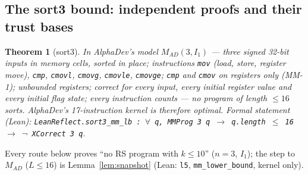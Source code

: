 \documentclass[11pt]{article}
\newtheorem{theorem}{Theorem}\newtheorem{lemma}[theorem]{Lemma}\newtheorem{corollary}[theorem]{Corollary}
\theoremstyle{remark}\newtheorem{remark}[theorem]{Remark}
\begin{document}
\subsection{The sort3 bound: independent proofs and their trust bases}\label{sec:sort3trust}
\begin{theorem}[sort3]\label{thm:sort3}
In AlphaDev's model $M_{AD}(3, I_1)$ --- three signed 32-bit inputs in memory cells, sorted in place; instructions
\texttt{mov} (load, store, register move), \texttt{cmp}, \texttt{cmovl}, \texttt{cmovg}, \texttt{cmovle}, \texttt{cmovge}; \texttt{cmp}
and \texttt{cmov} on registers only (MM-1); unbounded registers; correct for every input, every initial register value and
every initial flag state; every instruction counts --- no program of length $\le 16$ sorts. AlphaDev's 17-instruction kernel is
therefore optimal. Formal statement (Lean): \texttt{LeanReflect.sort3\_mm\_lb :
$\forall$ q, MMProg 3 q $\to$ q.length $\le$ 16 $\to$ $\lnot$ XCorrect 3 q}.
\end{theorem}
Every route below proves ``no RS program with $k \le 10$'' ($n=3$, $I_1$); the step to $M_{AD}$ ($L \le 16$) is
Lemma~\ref{lem:snapshot} (Lean: \texttt{l5}, \texttt{mm\_lower\_bound}, kernel only).
\end{document}
